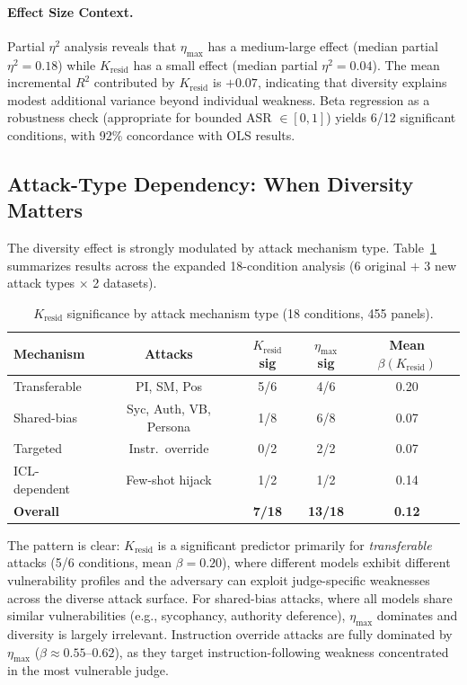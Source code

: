 \documentclass[11pt,a4paper]{article}
\newcommand{\etamax}{\eta_{\max}}
\newcommand{\kresid}{K_{\text{resid}}}
\begin{document}
\paragraph{Effect Size Context.} Partial $\eta^2$ analysis reveals that $\etamax$ has a medium-large effect (median partial $\eta^2 = 0.18$) while $\kresid$ has a small effect (median partial $\eta^2 = 0.04$). The mean incremental $R^2$ contributed by $\kresid$ is $+0.07$, indicating that diversity explains modest additional variance beyond individual weakness. Beta regression as a robustness check (appropriate for bounded ASR $\in [0,1]$) yields 6/12 significant conditions, with 92\% concordance with OLS results.

\subsection{Attack-Type Dependency: When Diversity Matters}

The diversity effect is strongly modulated by attack mechanism type. Table~\ref{tab:attack_mechanism} summarizes results across the expanded 18-condition analysis (6 original $+$ 3 new attack types $\times$ 2 datasets).

\begin{table}[t]
\centering
\caption{$\kresid$ significance by attack mechanism type (18 conditions, 455 panels).}
\label{tab:attack_mechanism}
\small
\begin{tabular}{@{}lcccc@{}}
\toprule
Mechanism & Attacks & $\kresid$ sig & $\etamax$ sig & Mean $\beta(\kresid)$ \\
\midrule
Transferable & PI, SM, Pos & 5/6 & 4/6 & 0.20 \\
Shared-bias & Syc, Auth, VB, Persona & 1/8 & 6/8 & 0.07 \\
Targeted & Instr.\ override & 0/2 & 2/2 & 0.07 \\
ICL-dependent & Few-shot hijack & 1/2 & 1/2 & 0.14 \\
\midrule
\textbf{Overall} & & \textbf{7/18} & \textbf{13/18} & \textbf{0.12} \\
\bottomrule
\end{tabular}
\end{table}

The pattern is clear: $\kresid$ is a significant predictor primarily for \emph{transferable} attacks (5/6 conditions, mean $\beta = 0.20$), where different models exhibit different vulnerability profiles and the adversary can exploit judge-specific weaknesses across the diverse attack surface. For shared-bias attacks, where all models share similar vulnerabilities (e.g., sycophancy, authority deference), $\etamax$ dominates and diversity is largely irrelevant. Instruction override attacks are fully dominated by $\etamax$ ($\beta \approx 0.55$--$0.62$), as they target instruction-following weakness concentrated in the most vulnerable judge.
\end{document}

